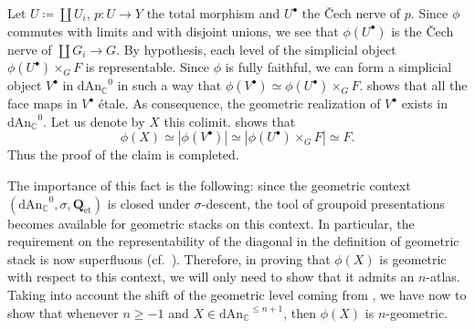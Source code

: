 \documentclass[12pt,a4paper,reqno]{amsart}
\theoremstyle{plain}
\theoremstyle{definition}
\theoremstyle{remark}
\numberwithin{equation}{section}
\begin{document}
Let $U \coloneqq \coprod U_i$, $p \colon U \to Y$ the total morphism and $U^\bullet$ the \v{C}ech nerve of $p$.
Since $\phi$ commutes with limits and with disjoint unions, we see that $\phi(U^\bullet)$ is the \v{C}ech nerve of $\coprod G_i \to G$.
By hypothesis, each level of the simplicial object $\phi(U^\bullet) \times_G F$ is representable. Since $\phi$ is fully faithful, we can form a simplicial object $V^\bullet$ in ${\mathrm{dAn}_{\mathbb C}}^0$ in such a way that $\phi(V^\bullet) \simeq \phi(U^\bullet) \times_G F$.
{\ignorespaces}
 shows that all the face maps in $V^\bullet$ \'etale.
As consequence, the geometric realization of $V^\bullet$ exists in ${\mathrm{dAn}_{\mathbb C}}^0$.
Let us denote by $X$ this colimit.
 shows that
\[ \phi(X) \simeq |\phi(V^\bullet)| \simeq |\phi(U^\bullet) \times_G F| \simeq F . \]
Thus the proof of the claim is completed.

The importance of this fact is the following: since the geometric context $({\mathrm{dAn}_{\mathbb C}}^0, \sigma, \mathbf Q_{\mathrm{\acute{e}t}})$ is closed under $\sigma$-descent, the tool of groupoid presentations becomes available for geometric stacks on this context.
In particular, the requirement on the representability of the diagonal in the definition of geometric stack is now superfluous (cf.\ \cite[Remark 1.3.3.2]{HAG-II}).
Therefore, in proving that $\phi(X)$ is geometric with respect to this context, we will only need to show that it admits an $n$-atlas. 
Taking into account the shift of the geometric level coming from \cite[Lemma 2.36]{Porta_Yu_Higher_analytic_stacks_2014}, we have now to show that whenever $n \ge -1$ and $X \in {\mathrm{dAn}_{\mathbb C}}^{\le n + 1}$, then $\phi(X)$ is $n$-geometric.
\end{document}
